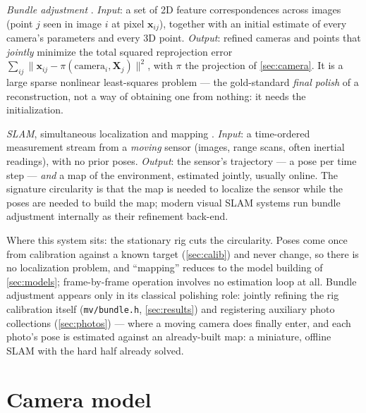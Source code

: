 \documentclass[11pt]{article}
\theoremstyle{definition}
\newcommand{\vect}[1]{\mathbf{#1}}
\newcommand{\X}{\vect{X}}
\newcommand{\x}{\vect{x}}
\newcommand{\code}[1]{\texttt{#1}}
\begin{document}
\emph{Bundle adjustment} \cite{Triggs2000}. \emph{Input}: a set of 2D
feature correspondences across images (point $j$ seen in image $i$ at
pixel $\x_{ij}$), together with an initial estimate of every camera's
parameters and every 3D point. \emph{Output}: refined cameras and
points that \emph{jointly} minimize the total squared reprojection
error $\sum_{ij}\|\x_{ij}-\pi(\text{camera}_i,\X_j)\|^2$, with
$\pi$ the projection of \autoref{sec:camera}. It is a large sparse
nonlinear least-squares problem --- the gold-standard \emph{final
polish} of a reconstruction, not a way of obtaining one from nothing:
it needs the initialization.

\emph{SLAM}, simultaneous localization and mapping \cite{Cadena2016}.
\emph{Input}: a time-ordered measurement stream from a \emph{moving}
sensor (images, range scans, often inertial readings), with no prior
poses. \emph{Output}: the sensor's trajectory --- a pose per time step
--- \emph{and} a map of the environment, estimated jointly, usually
online. The signature circularity is that the map is needed to
localize the sensor while the poses are needed to build the map;
modern visual SLAM systems run bundle adjustment internally as their
refinement back-end.

Where this system sits: the stationary rig cuts the circularity.
Poses come once from calibration against a known target
(\autoref{sec:calib}) and never change, so there is no localization
problem, and ``mapping'' reduces to the model building of
\autoref{sec:models}; frame-by-frame operation involves no estimation
loop at all. Bundle adjustment appears only in its classical polishing
role: jointly refining the rig calibration itself (\code{mv/bundle.h},
\autoref{sec:results}) and registering auxiliary photo collections
(\autoref{sec:photos}) --- where a moving camera does finally enter,
and each photo's pose is estimated against an already-built map: a
miniature, offline SLAM with the hard half already solved.

\section{Camera model}
\label{sec:camera}
\end{document}
